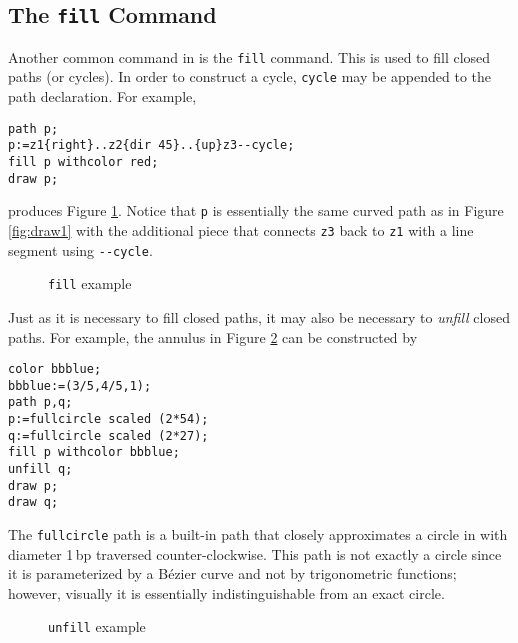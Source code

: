 \subsection{The \texttt{fill} Command}

Another common command in \MP{} is the \texttt{fill} command.  This is
used to fill closed paths (or cycles).  In order to construct a cycle,
\texttt{cycle} may be appended to the path declaration.  For example,

\begin{lstlisting}[xleftmargin=7bp]
path p;
p:=z1{right}..z2{dir 45}..{up}z3--cycle;
fill p withcolor red;
draw p;
\end{lstlisting}

produces Figure \ref{fig:fill}.  Notice that \texttt{p} is essentially
the same curved path as in Figure \ref{fig:draw1} with the additional
piece that connects \texttt{z3} back to \texttt{z1} with a line segment
using \texttt{-{}-cycle}.

\begin{figure}[hptb]
	\begin{center}
  \end{center}
	\caption{\texttt{fill} example}
  \label{fig:fill}
\end{figure}

Just as it is necessary to fill closed paths, it may also be necessary
to \textit{unfill} closed paths.  For example, the annulus in Figure
\ref{fig:annulus1} can be constructed by

\begin{lstlisting}[xleftmargin=38bp]
color bbblue;
bbblue:=(3/5,4/5,1);
path p,q;
p:=fullcircle scaled (2*54);
q:=fullcircle scaled (2*27);
fill p withcolor bbblue;
unfill q;
draw p;
draw q;
\end{lstlisting}

The \texttt{fullcircle} path is a built-in path that closely
approximates a circle in \MP{} with diameter 1\,bp traversed
counter-clockwise.  This path is not exactly a circle since it is
parameterized by a B\'{e}zier curve and not by trigonometric functions;
however, visually it is essentially indistinguishable from an exact
circle.

\begin{figure}[hptb]
	\begin{center}
  \end{center}
	\caption{\texttt{unfill} example}
  \label{fig:annulus1}
\end{figure}

